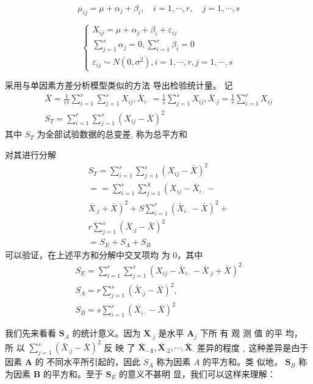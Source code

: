 $$
\mu_{i j}=\mu+\alpha_{j}+\beta_{i}, \quad i=1, \cdots, r, \quad j=1, \cdots, s
$$

$$ \left\{\begin{array}{l}X_{i j}=\mu+\alpha_{j}+\beta_{i}+\varepsilon_{i j} \\ \sum_{j=1}^{s} \alpha_{j}=0, \sum_{i=1}^{r} \beta_{i}=0 \\ \varepsilon_{i j} \sim N\left(0, \sigma^{2}\right), i=1, \cdots, r, j=1, \cdots, s\end{array}\right. $$

采用与单因素方差分析模型类似的方法 导出检验统计量。
记
$$
\begin{array}{c}
\bar{X}=\frac{1}{r s} \sum_{i=1}^{r} \sum_{j=1}^{s} X_{i j}, \bar{X}_{i \cdot}=\frac{1}{s} \sum_{j=1}^{s} X_{i j}, \bar{X}_{\cdot j}=\frac{1}{r} \sum_{i=1}^{r} X_{i j} \\
S_{T}=\sum_{i=1}^{r} \sum_{j=1}^{s}\left(X_{i j}-\bar{X}\right)^{2}
\end{array}
$$
其中 \( S_{T} \) 为全部试验数据的总变差, 称为总平方和

对其进行分解
$$
\begin{array}{c}
S_{T}=\sum_{i=1}^{r} \sum_{j=1}^{s}\left(X_{i j}-\bar{X}\right)^{2} \\
==\sum_{i=1}^{r} \sum_{j=1}^{S}\left(X_{i j}-\bar{X}_{i \cdot}-\right. \\
\left.\bar{X}_{\cdot j}+\bar{X}\right)^{2}+S \sum_{i=1}^{r}\left(\bar{X}_{i \cdot}-\bar{X}\right)^{2}+ \\
r \sum_{j=1}^{s}\left(\bar{X}_{\cdot j}-\bar{X}\right)^{2} \\
=S_{E}+S_{A}+S_{B}
\end{array}
$$
可以验证，在上述平方和分解中交叉项均
为 0，其中
$$
\begin{array}{c}
S_{E}=\sum_{i=1}^{r} \sum_{j=1}^{s}\left(X_{i j}-\bar{X}_{i \cdot}-\bar{X}_{\cdot j}+\bar{X}\right)^{2} \\
S_{A}=r \sum_{j=1}^{s}\left(\bar{X}_{\cdot j}-\bar{X}\right)^{2}, \\
S_{B}= s \sum_{i=1}^{r}\left(\bar{X}_{i \cdot}-\bar{X}\right)^{2}
\end{array}
$$

我们先来看看 \( \boldsymbol{S}_{A} \) 的统计意义。因为 \( \overline{\boldsymbol{X}}_{\mathbf{\cdot} j} \) 是水平 \( \boldsymbol{A}_{j} \) 下所
有 观 测 值 的平 均， 所 以 \( \sum_{j=1}^{s}\left(\bar{X}_{\cdot j}-\bar{X}\right)^{2} \) 反 映 了
\( \overline{\boldsymbol{X}}_{\mathbf{- 1}}, \overline{\boldsymbol{X}}_{\cdot 2}, \cdots, \overline{\boldsymbol{X}}_{\boldsymbol{\cdot}} \) 差异的程度 \( _{\circ} \) 这种差异是甴于因素 \( \boldsymbol{A} \) 的
不同水平所引起的，因此 \( S_{A} \) 称为因素 \( A \) 的平方和。类
似地， \( \boldsymbol{S}_{B} \) 称为因素 \( \boldsymbol{B} \) 的平方和。至于 \( \boldsymbol{S}_{E} \) 的意义不甚明
显，我们可以这样来理解：

